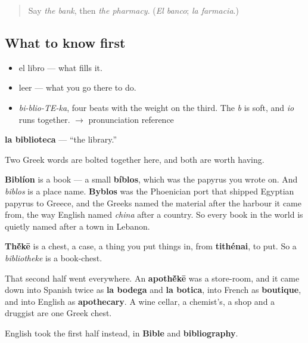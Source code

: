 \label{lesson:ES-C353-biblioteca}



\begin{quote}
Say \emph{the bank}, then \emph{the pharmacy}. (\emph{El banco}; \emph{la farmacia}.)
\end{quote}

\subsection*{What to know first}
\begin{itemize}
\raggedright
  \item el libro — what fills it.
  \item leer — what you go there to do.
\end{itemize}

\begin{sounds}
\begin{itemize}
\raggedright
  \item \emph{bi-blio-TE-ka}, four beats with the weight on the third. The \emph{b} is soft, and \emph{io} runs together. $\to$ pronunciation reference
\end{itemize}
\end{sounds}

\begin{cousinweb}
\textbf{la biblioteca} — \textquotedblleft{}the library.\textquotedblright{}

Two Greek words are bolted together here, and both are worth having.

\textbf{Biblíon} is a book — a small \textbf{bíblos}, which was the papyrus you wrote on. And \emph{biblos} is a place name. \textbf{Byblos} was the Phoenician port that shipped Egyptian papyrus to Greece, and the Greeks named the material after the harbour it came from, the way English named \emph{china} after a country. So every book in the world is quietly named after a town in Lebanon.

\textbf{Th\'{\={e}}kē} is a chest, a case, a thing you put things in, from \textbf{tithénai}, to put. So a \emph{bibliotheke} is a book-chest.

That second half went everywhere. An \textbf{apoth\'{\={e}}kē} was a store-room, and it came down into Spanish twice as \textbf{la bodega} and \textbf{la botica}, into French as \textbf{boutique}, and into English as \textbf{apothecary}. A wine cellar, a chemist's, a shop and a druggist are one Greek chest.

English took the first half instead, in \textbf{Bible} and \textbf{bibliography}.
\end{cousinweb}

